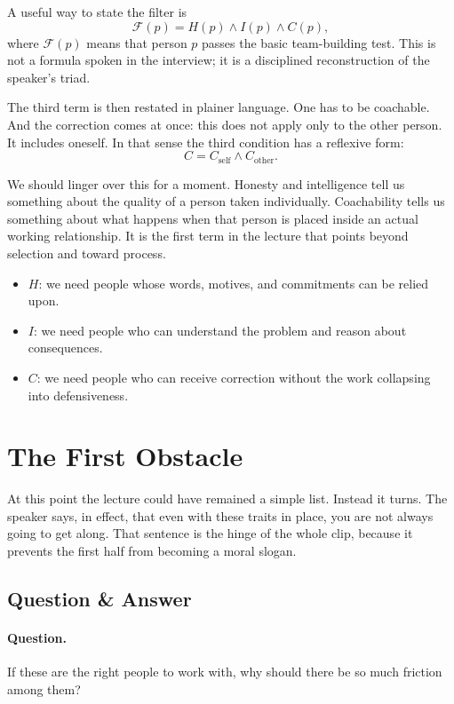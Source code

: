 A useful way to state the filter is
\begin{equation}
\mathcal{F}(p)=H(p)\wedge I(p)\wedge C(p),
\end{equation}
where \(\mathcal{F}(p)\) means that person \(p\) passes the basic team-building test. This is not a formula spoken in the interview; it is a disciplined reconstruction of the speaker's triad.

The third term is then restated in plainer language. One has to be coachable. And the correction comes at once: this does not apply only to the other person. It includes oneself. In that sense the third condition has a reflexive form:
\begin{equation}
C = C_{\text{self}} \wedge C_{\text{other}}.
\end{equation}

We should linger over this for a moment. Honesty and intelligence tell us something about the quality of a person taken individually. Coachability tells us something about what happens when that person is placed inside an actual working relationship. It is the first term in the lecture that points beyond selection and toward process.

\begin{itemize}
\item \(H\): we need people whose words, motives, and commitments can be relied upon.
\item \(I\): we need people who can understand the problem and reason about consequences.
\item \(C\): we need people who can receive correction without the work collapsing into defensiveness.
\end{itemize}

\section{The First Obstacle}

At this point the lecture could have remained a simple list. Instead it turns. The speaker says, in effect, that even with these traits in place, you are not always going to get along. That sentence is the hinge of the whole clip, because it prevents the first half from becoming a moral slogan.

\subsection{Question \& Answer}

\paragraph{Question.} If these are the right people to work with, why should there be so much friction among them?

